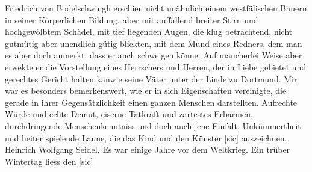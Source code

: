 \def\day{1.9.1942}
\mktitle

Friedrich von Bodelschwingh erschien nicht un\"{a}hnlich einem westf\"{a}lischen Bauern in seiner K\"{o}rperlichen Bildung, aber mit auffallend breiter Stirn und hochgew\"{o}lbtem Sch\"{a}del, mit tief liegenden Augen, die klug betrachtend, nicht gutm\"{u}tig aber unendlich g\"{u}tig blickten, mit dem Mund eines Redners, dem man es aber doch anmerkt, dass er auch schweigen k\"{o}nne.
Auf mancherlei Weise aber erwekte er die Vorstellung eines Herrschers und Herren, der in Liebe gebietet und gerechtes Gericht halten kanwie seine V\"{a}ter unter der Linde zu Dortmund.
Mir war es besonders bemerkenswert, wie er in sich Eigenschaften vereinigte, die gerade in ihrer Gegens\"{a}tzlichkeit einen ganzen Menschen darstellten.
Aufrechte W\"{u}rde und echte Demut, eiserne Tatkraft und zartestes Erbarmen, durchdringende Menschenkenntniss und doch auch jene Einfalt, Unk\"{u}mmertheit und heiter spielende Laune, die das Kind und den K\"{u}nster {\color{red} [sic] } auszeichnen.
Heinrich Wolfgang Seidel.
Es war einige Jahre vor dem Weltkrieg.
Ein tr\"{u}ber Wintertag liess den {\color{red} [sic] }

\clearpage
